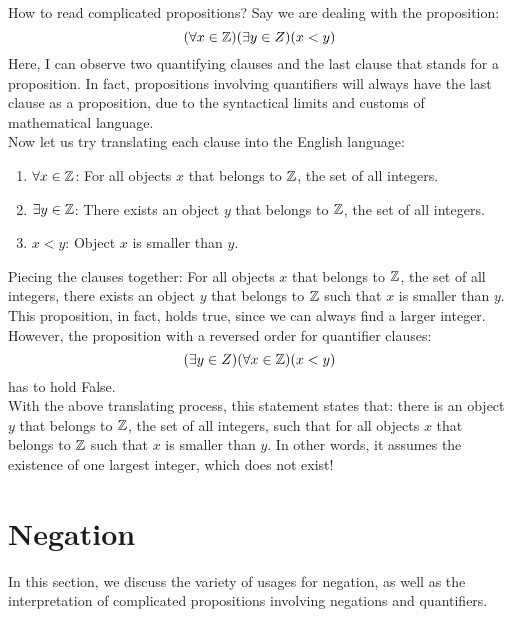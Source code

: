\begin{ln-think}{How to read complicated propositions?}{}
    Say we are dealing with the proposition:
    \[(\forall x \in \mathbb{Z})(\exists y \in Z)(x < y)\]
    Here, I can observe two quantifying clauses and the last clause that stands for a proposition. In fact, propositions involving quantifiers will always have the last clause as a proposition, due to the syntactical limits and customs of mathematical language. \\
    Now let us try translating each clause into the English language:
    \begin{enumerate}
        \item $\forall x \in \mathbb{Z}$: For all objects $x$ that belongs to $\mathbb{Z}$, the set of all integers.
        \item $\exists y \in \mathbb{Z}$: There exists an object $y$ that belongs to $\mathbb{Z}$, the set of all integers.
        \item $x < y$: Object $x$ is smaller than $y$.
    \end{enumerate}
    Piecing the clauses together: For all objects $x$ that belongs to $\mathbb{Z}$, the set of all integers, there exists an object $y$ that belongs to $\mathbb{Z}$ such that $x$ is smaller than $y$. \\
    This proposition, in fact, holds true, since we can always find a larger integer. \\
    However, the proposition with a reversed order for quantifier clauses:
    \[(\exists y \in Z)(\forall x \in \mathbb{Z})(x < y)\]
    has to hold False. \\
    With the above translating process, this statement states that: there is an object $y$ that belongs to $\mathbb{Z}$, the set of all integers, such that for all objects $x$ that belongs to $\mathbb{Z}$ such that $x$ is smaller than $y$. In other words, it assumes the existence of one largest integer, which does not exist!
\end{ln-think}

\section{Negation}
In this section, we discuss the variety of usages for negation, as well as the interpretation of complicated propositions involving negations and quantifiers.

